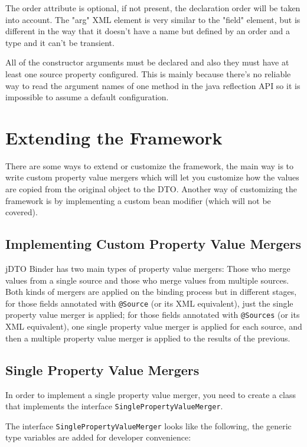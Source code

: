 \documentclass[11pt]{article}
\newcommand{\JDTO}{jDTO Binder\xspace}
\begin{document}
The order attribute is optional, if not present, the declaration order will be taken into account. The "arg" XML element is very similar to the "field" element, but is different in the way that it doesn't have a name but defined by an order and a type and it can't be transient. 

All of the constructor arguments must be declared and also they must have at least one source property configured. This is mainly because there's no reliable way to read the argument names of one method in the java reflection API so it is impossible to assume a default configuration.


\section{Extending the Framework}

There are some ways to extend or customize the framework, the main way is to write custom property value mergers which will let you customize how the values are copied from the original object to the DTO. Another way of customizing the framework is by implementing a custom bean modifier (which will not be covered). 


\subsection{Implementing Custom Property Value Mergers}

\JDTO has two main types of property value mergers: Those who merge values from a single source and those who merge values from multiple sources. Both kinds of mergers are applied on the binding process but in different stages, for those fields annotated with \texttt{@Source} (or its XML equivalent), just the single property value merger is applied; for those fields annotated with \texttt{@Sources} (or its XML equivalent), one single property value merger is applied for each source, and then a multiple property value merger is applied to the results of the previous.

\subsection{Single Property Value Mergers}

In order to implement a single property value merger, you need to create a class that implements the interface \texttt{SinglePropertyValueMerger}.

The interface \texttt{SinglePropertyValueMerger} looks like the following, the generic type variables are added for developer convenience:
\end{document}
